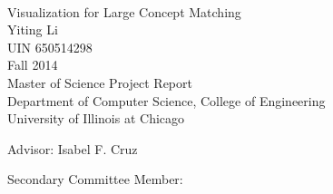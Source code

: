 
\thispagestyle{empty}
\mbox{}\\[6pc]
\begin{center}
\Huge{Visualization for Large Concept Matching}\\[2pc]

\Large{Yiting Li}\\[1pc]
\large{UIN 650514298}\\[1pc]
\large{Fall 2014}\\[2pc]

Master of Science Project Report\\
Department of Computer Science, College of Engineering\\
University of Illinois at Chicago
\end{center}
\vfill

\noindent Advisor: Isabel F. Cruz

\noindent Secondary Committee Member:

